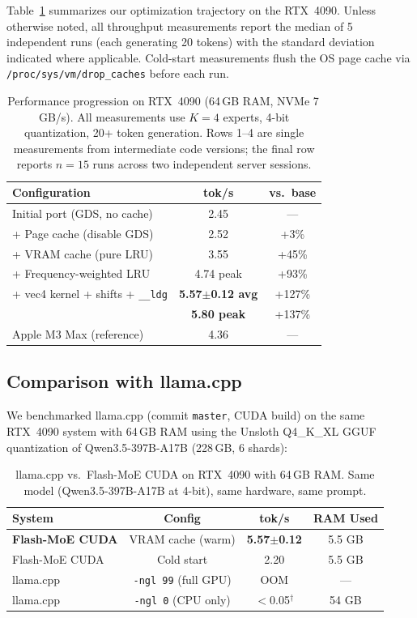 \documentclass[10pt]{article}
\begin{document}
Table~\ref{tab:results} summarizes our optimization trajectory on the RTX~4090. Unless otherwise noted, all throughput measurements report the median of 5 independent runs (each generating 20 tokens) with the standard deviation indicated where applicable. Cold-start measurements flush the OS page cache via \texttt{/proc/sys/vm/drop\_caches} before each run.

\begin{table}[h]
\centering
\small
\caption{Performance progression on RTX~4090 (64\,GB RAM, NVMe 7\,GB/s). All measurements use $K=4$ experts, 4-bit quantization, 20+ token generation. Rows 1--4 are single measurements from intermediate code versions; the final row reports $n=15$ runs across two independent server sessions.}
\label{tab:results}
\begin{tabular}{lcc}
\toprule
\textbf{Configuration} & \textbf{tok/s} & \textbf{vs.\ base} \\
\midrule
Initial port (GDS, no cache) & 2.45 & --- \\
+ Page cache (disable GDS) & 2.52 & +3\% \\
+ VRAM cache (pure LRU) & 3.55 & +45\% \\
+ Frequency-weighted LRU & 4.74 peak & +93\% \\
+ vec4 kernel + shifts + \texttt{\_\_ldg} & \textbf{5.57$\pm$0.12 avg} & +127\% \\
& \textbf{5.80 peak} & +137\% \\
\midrule
Apple M3 Max (reference) & 4.36 & --- \\
\bottomrule
\end{tabular}
\end{table}

\subsection{Comparison with llama.cpp}

We benchmarked llama.cpp (commit \texttt{master}, CUDA build) on the same RTX~4090 system with 64\,GB RAM using the Unsloth Q4\_K\_XL GGUF quantization of Qwen3.5-397B-A17B (228\,GB, 6 shards):

\begin{table}[h]
\centering
\small
\caption{llama.cpp vs.\ Flash-MoE CUDA on RTX~4090 with 64\,GB RAM. Same model (Qwen3.5-397B-A17B at 4-bit), same hardware, same prompt.}
\label{tab:llamacpp}
\begin{tabular}{lccc}
\toprule
\textbf{System} & \textbf{Config} & \textbf{tok/s} & \textbf{RAM Used} \\
\midrule
\textbf{Flash-MoE CUDA} & VRAM cache (warm) & \textbf{5.57$\pm$0.12} & 5.5 GB \\
Flash-MoE CUDA & Cold start & 2.20 & 5.5 GB \\
\midrule
llama.cpp & \texttt{-ngl 99} (full GPU) & OOM & --- \\
llama.cpp & \texttt{-ngl 0} (CPU only) & $<$0.05$^\dagger$ & 54 GB \\
\bottomrule
\end{tabular}
\end{table}
\end{document}
